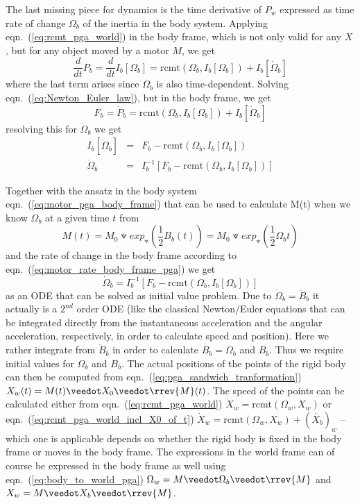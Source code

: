 The last missing piece for dynamics is the time derivative of $P_{w}$ expressed as time
rate of change $\Omega_b$ of the inertia in the body system. Applying
eqn.~(\ref{eq:rcmt_pga_world}) in the body frame, which is not only valid for any $X$, but
for any object moved by a motor $M$, we get
\begin{equation}
    \frac{d}{dt} P_b = \frac{d}{dt} I_b[\Omega_b] =
    \mathrm{rcmt}(\Omega_b,I_b[\Omega_b]) + I_b[\dot{\Omega}_b]
\end{equation}
where the last term arises since $\Omega_b$ is also time-dependent. Solving
eqn.~(\ref{eq:Newton_Euler_law}), but in the body frame, we get
\begin{equation}
    F_b = \dot{P}_b = \mathrm{rcmt}(\Omega_b,I_b[\Omega_b]) + I_b[\dot{\Omega}_b]
\end{equation}
resolving this for $\dot{\Omega}_b$ we get
\begin{eqnarray}
    I_b[\dot{\Omega}_b] &=& F_{b} - \mathrm{rcmt}(\Omega_b,I_b[\Omega_b]) \\[5pt]
    \dot{\Omega}_b &=& I_b^{-1}\left[ F_{b} - \mathrm{rcmt}(\Omega_b,I_b[\Omega_b]) \right]
\end{eqnarray}

Together with the ansatz in the body system eqn.~(\ref{eq:motor_pga_body_frame}) that can
be used to calculate M(t) when we know $\Omega_b$ at a given time $t$ from
\begin{equation*}
   M(t) = M_0 \veedot exp_\veedot(\frac{1}{2} B_b(t))
        = M_0 \veedot exp_\veedot(\frac{1}{2} \Omega_b t) 
\end{equation*}
and the rate of change in the body frame according to
eqn.~(\ref{eq:motor_rate_body_frame_pga}) we get
\begin{equation}
    \dot{\Omega}_b = I_b^{-1}\left[ F_{b} - \mathrm{rcmt}(\Omega_b,I_b[\Omega_b]) \right] 
    \label{eq:ode_system_body_frame}
\end{equation}
as an ODE that can be solved as initial value problem. Due to $\dot{\Omega}_b =
\ddot{B}_b$ it actually is a $2^{nd}$ order ODE (like the classical Newton/Euler equations
that can be integrated directly from the instantaneous acceleration and the angular
acceleration, respectively, in order to calculate speed and position). Here we rather
integrate from $\ddot{B}_b$ in order to calculate $\dot{B_b} = \Omega_b$ and $B_b$. Thus
we require initial values for $\Omega_b$ and $B_b$. The actual positions of the points of
the rigid body can then be computed from eqn.~(\ref{eq:pga_sandwich_tranformation})
$X_w(t) = M(t) \veedot X_0 \veedot \rrev{M}(t)$. The speed of the points can be calculated
either from eqn.~(\ref{eq:rcmt_pga_world}) $\dot{X}_w = \mathrm{rcmt}(\Omega_w,X_w)$ or
eqn.~(\ref{eq:rcmt_pga_world_incl_X0_of_t}) $\dot{X}_w = \mathrm{rcmt}(\Omega_w,X_w)+
(\dot{X_b})_w$ -- which one is applicable depends on whether the rigid body is fixed in
the body frame or moves in the body frame. The expressions in the world frame can of
course be expressed in the body frame as well using eqn.~(\ref{eq:body_to_world_pga})
$\Omega_w = M \veedot \Omega_b \veedot \rrev{M}$ and $X_w = M \veedot X_b \veedot
\rrev{M}$.\\

